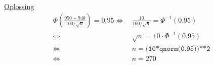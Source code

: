 \documentclass[kulak]{kulakarticle} %
\begin{document}
\begin{itemize}
	\underline{Oplossing}
	\begin{align*}
		\Phi\left(\frac{950-940}{100/\sqrt{n}} \right) = 0.95
		\Longleftrightarrow \, & \frac{10}{100/\sqrt{n}} = \Phi^{-1}(0.95) \\
		\Longleftrightarrow \, & \sqrt{n}=10\cdot\Phi^{-1}(0.95) \\
		\Longleftrightarrow \, & n=\texttt{(10*qnorm(0.95))**2} \\
		\Longleftrightarrow \, & n=270
	\end{align*}
\end{itemize}
\end{document}
